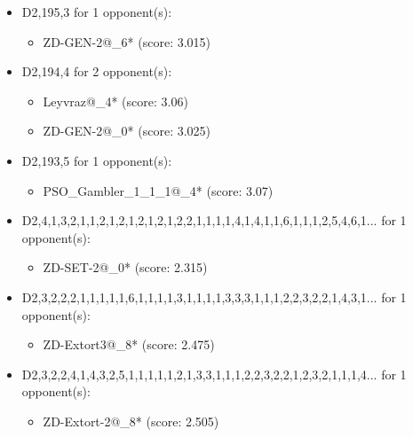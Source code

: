 \begin{appendices}
\begin{itemize}
    \item D2,195,3 for 1 opponent(s):
    \begin{multicols}{3}
         \begin{itemize}
            \item ZD-GEN-2@\_6* (score: 3.015)
        \end{itemize}
     \end{multicols}
     
    \item D2,194,4 for 2 opponent(s):
    \begin{multicols}{3}
         \begin{itemize}
            \item Leyvraz@\_4* (score: 3.06)
            \item ZD-GEN-2@\_0* (score: 3.025)
        \end{itemize}
     \end{multicols}
     
    \item D2,193,5 for 1 opponent(s):
    \begin{multicols}{3}
         \begin{itemize}
            \item PSO\_Gambler\_1\_1\_1@\_4* (score: 3.07)
        \end{itemize}
     \end{multicols}
     
    \item D2,4,1,3,2,1,1,2,1,2,1,2,1,2,1,2,2,1,1,1,1,4,1,4,1,1,6,1,1,1,2,5,4,6,1... for 1 opponent(s):
    \begin{multicols}{3}
         \begin{itemize}
            \item ZD-SET-2@\_0* (score: 2.315)
        \end{itemize}
     \end{multicols}
     
    \item D2,3,2,2,2,1,1,1,1,1,6,1,1,1,1,3,1,1,1,1,3,3,3,1,1,1,2,2,3,2,2,1,4,3,1... for 1 opponent(s):
    \begin{multicols}{3}
         \begin{itemize}
            \item ZD-Extort3@\_8* (score: 2.475)
        \end{itemize}
     \end{multicols}
     
    \item D2,3,2,2,4,1,4,3,2,5,1,1,1,1,1,2,1,3,3,1,1,1,2,2,3,2,2,1,2,3,2,1,1,1,4... for 1 opponent(s):
    \begin{multicols}{3}
         \begin{itemize}
            \item ZD-Extort-2@\_8* (score: 2.505)
        \end{itemize}
     \end{multicols}
     

\end{itemize}
\end{appendices}
